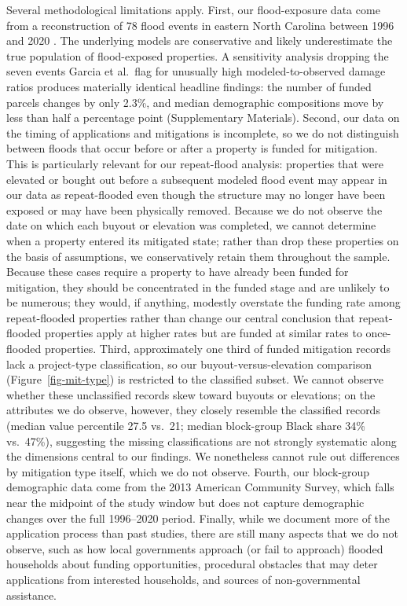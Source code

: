 \documentclass[
  authoryear,
  preprint]{elsarticle}
\begin{document}
Several methodological limitations apply. First, our flood-exposure data
come from a reconstruction of 78 flood events in eastern North Carolina
between 1996 and 2020 \citep{garciaReconstructingRepetitiveFlood2025}.
The underlying models are conservative and likely underestimate the true
population of flood-exposed properties. A sensitivity analysis dropping
the seven events Garcia et al.~flag for unusually high
modeled-to-observed damage ratios produces materially identical headline
findings: the number of funded parcels changes by only 2.3\%, and median
demographic compositions move by less than half a percentage point
(Supplementary Materials). Second, our data on the timing of
applications and mitigations is incomplete, so we do not distinguish
between floods that occur before or after a property is funded for
mitigation. This is particularly relevant for our repeat-flood analysis:
properties that were elevated or bought out before a subsequent modeled
flood event may appear in our data as repeat-flooded even though the
structure may no longer have been exposed or may have been physically
removed. Because we do not observe the date on which each buyout or
elevation was completed, we cannot determine when a property entered its
mitigated state; rather than drop these properties on the basis of
assumptions, we conservatively retain them throughout the sample.
Because these cases require a property to have already been funded for
mitigation, they should be concentrated in the funded stage and are
unlikely to be numerous; they would, if anything, modestly overstate the
funding rate among repeat-flooded properties rather than change our
central conclusion that repeat-flooded properties apply at higher rates
but are funded at similar rates to once-flooded properties. Third,
approximately one third of funded mitigation records lack a project-type
classification, so our buyout-versus-elevation comparison
(Figure~\ref{fig-mit-type}) is restricted to the classified subset. We
cannot observe whether these unclassified records skew toward buyouts or
elevations; on the attributes we do observe, however, they closely
resemble the classified records (median value percentile 27.5 vs.~21;
median block-group Black share 34\% vs.~47\%), suggesting the missing
classifications are not strongly systematic along the dimensions central
to our findings. We nonetheless cannot rule out differences by
mitigation type itself, which we do not observe. Fourth, our block-group
demographic data come from the 2013 American Community Survey, which
falls near the midpoint of the study window but does not capture
demographic changes over the full 1996--2020 period. Finally, while we
document more of the application process than past studies, there are
still many aspects that we do not observe, such as how local governments
approach (or fail to approach) flooded households about funding
opportunities, procedural obstacles that may deter applications from
interested households, and sources of non-governmental assistance.
\end{document}
